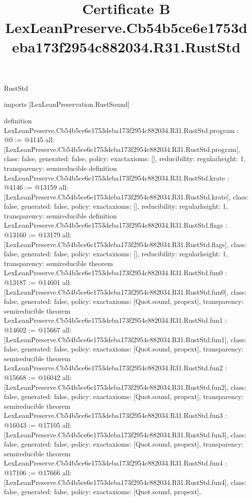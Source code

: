 \begin{lexlean}{RustStd}
\title{Certificate B LexLeanPreserve.Cb54b5ce6e1753deba173f2954c882034.R31.RustStd}
\begin{coremodule}
imports [LexLeanPreservation.RustSound]

definition LexLeanPreserve.Cb54b5ce6e1753deba173f2954c882034.R31.RustStd.program : @0 := @4145 {
  all: [LexLeanPreserve.Cb54b5ce6e1753deba173f2954c882034.R31.RustStd.program],
  class: false,
  generated: false,
  policy: exact{axioms: []},
  reducibility: regular{height: 1},
  transparency: semireducible
}
definition LexLeanPreserve.Cb54b5ce6e1753deba173f2954c882034.R31.RustStd.krate : @4146 := @13159 {
  all: [LexLeanPreserve.Cb54b5ce6e1753deba173f2954c882034.R31.RustStd.krate],
  class: false,
  generated: false,
  policy: exact{axioms: []},
  reducibility: regular{height: 1},
  transparency: semireducible
}
definition LexLeanPreserve.Cb54b5ce6e1753deba173f2954c882034.R31.RustStd.flags : @13160 := @13179 {
  all: [LexLeanPreserve.Cb54b5ce6e1753deba173f2954c882034.R31.RustStd.flags],
  class: false,
  generated: false,
  policy: exact{axioms: []},
  reducibility: regular{height: 1},
  transparency: semireducible
}
theorem LexLeanPreserve.Cb54b5ce6e1753deba173f2954c882034.R31.RustStd.fun0 : @13187 := @14601 {
  all: [LexLeanPreserve.Cb54b5ce6e1753deba173f2954c882034.R31.RustStd.fun0],
  class: false,
  generated: false,
  policy: exact{axioms: [Quot.sound, propext]},
  transparency: semireducible
}
theorem LexLeanPreserve.Cb54b5ce6e1753deba173f2954c882034.R31.RustStd.fun1 : @14602 := @15667 {
  all: [LexLeanPreserve.Cb54b5ce6e1753deba173f2954c882034.R31.RustStd.fun1],
  class: false,
  generated: false,
  policy: exact{axioms: [Quot.sound, propext]},
  transparency: semireducible
}
theorem LexLeanPreserve.Cb54b5ce6e1753deba173f2954c882034.R31.RustStd.fun2 : @15668 := @16042 {
  all: [LexLeanPreserve.Cb54b5ce6e1753deba173f2954c882034.R31.RustStd.fun2],
  class: false,
  generated: false,
  policy: exact{axioms: [Quot.sound, propext]},
  transparency: semireducible
}
theorem LexLeanPreserve.Cb54b5ce6e1753deba173f2954c882034.R31.RustStd.fun3 : @16043 := @17105 {
  all: [LexLeanPreserve.Cb54b5ce6e1753deba173f2954c882034.R31.RustStd.fun3],
  class: false,
  generated: false,
  policy: exact{axioms: [Quot.sound, propext]},
  transparency: semireducible
}
theorem LexLeanPreserve.Cb54b5ce6e1753deba173f2954c882034.R31.RustStd.fun4 : @17106 := @17666 {
  all: [LexLeanPreserve.Cb54b5ce6e1753deba173f2954c882034.R31.RustStd.fun4],
  class: false,
  generated: false,
  policy: exact{axioms: [Quot.sound, propext]},
}
\end{coremodule}
\end{lexlean}
